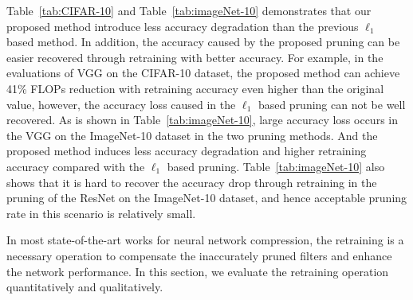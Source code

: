 \documentclass{article} %
\begin{document}

Table~\ref{tab:CIFAR-10} and Table~\ref{tab:imageNet-10} demonstrates that our proposed method introduce less accuracy degradation than the previous $\ell_1$ based method.
In addition, the accuracy caused by the proposed pruning can be easier recovered through retraining with better accuracy.
For example, in the evaluations of VGG on the CIFAR-10 dataset, the proposed method can achieve 41\% FLOPs reduction with retraining accuracy even higher than the original value, however, the accuracy loss caused in the $\ell_1$ based pruning can not be well recovered.
As is shown in Table~\ref{tab:imageNet-10}, large accuracy loss occurs in the VGG on the ImageNet-10 dataset in the two pruning methods.
And the proposed method induces less accuracy degradation and higher retraining accuracy compared with the $\ell_1$ based pruning.
Table~\ref{tab:imageNet-10} also shows that it is hard to recover the accuracy drop through retraining in the pruning of the ResNet on the ImageNet-10 dataset, and hence acceptable pruning rate in this scenario is relatively small.

In most state-of-the-art works for neural network compression, the retraining is a necessary operation to compensate the inaccurately pruned filters and enhance the network performance.
In this section, we evaluate the retraining operation quantitatively and qualitatively.
\end{document}

